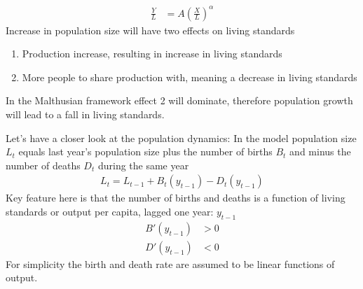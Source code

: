 \documentclass{beamer}
\begin{document}
\begin{frame}
\begin{align*}
  \frac{Y}{L} &=  A\left ( \frac{X}{L} \right)^{\alpha}
\end{align*}
  Increase in population size will have two effects on living standards  
  \begin{enumerate}
    \item Production increase, resulting in increase in living standards
    \item More people to share production with, meaning a decrease in living standards
  \end{enumerate}
  \medskip
  In the Malthusian framework effect 2 will dominate, therefore population growth will lead to a fall in living standards.   
\end{frame}

\begin{frame}
 Let's have a closer look at the population dynamics: In the model population size $L_t$ equals last year's population size plus the number of births $B_t$ and minus the number of deaths $D_t$ during the same year
  \begin{align}
   L_t = L_{t-1} + B_t(y_{t-1}) - D_t(y_{t-1})
  \end{align}
  \medskip
  Key feature here is that the number of births and deaths is a function of living standards or output per capita, lagged one year: $y_{t-1}$
  \begin{align}
    B'(y_{t-1})&>0\\
    D'(y_{t-1})&<0  
  \end{align}
  \medskip
  For simplicity the birth and death rate are assumed to be linear functions of output.
\end{frame}
\end{document}
